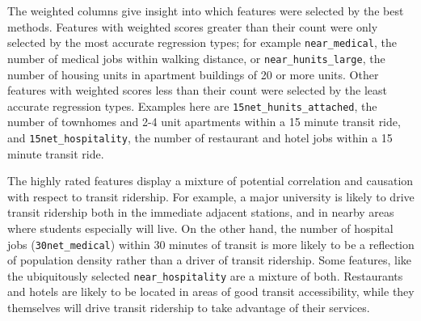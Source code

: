 \documentclass[11pt]{article}
\begin{document}
The weighted columns give insight into which features were selected by the best methods. Features with weighted scores greater than their count were only selected by the most accurate regression types; for example \texttt{near\_medical}, the number of medical jobs within walking distance, or \texttt{near\_hunits\_large}, the number of housing units in apartment buildings of 20 or more units. Other features with weighted scores less than their count were selected by the least accurate regression types. Examples here are \texttt{15net\_hunits\_attached}, the number of townhomes and 2-4 unit apartments within a 15 minute transit ride, and \texttt{15net\_hospitality}, the number of restaurant and hotel jobs within a 15 minute transit ride. 

The highly rated features display a mixture of potential correlation and causation with respect to transit ridership. For example, a major university is likely to drive transit ridership both in the immediate adjacent stations, and in nearby areas where students especially will live. On the other hand, the number of hospital jobs (\texttt{30net\_medical}) within 30 minutes of transit is more likely to be a reflection of population density rather than a driver of transit ridership. Some features, like the ubiquitously selected \texttt{near\_hospitality} are a mixture of both. Restaurants and hotels are likely to be located in areas of good transit accessibility, while they themselves will drive transit ridership to take advantage of their services. 
\end{document}
